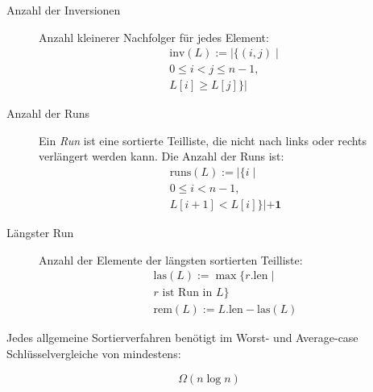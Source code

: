 \documentclass[uniLeipzig]{merkzettel}
\begin{document}
\begin{mzImportant}
  \begin{description}
    \item [Anzahl der Inversionen]
          Anzahl kleinerer Nachfolger für jedes Element:
          \begin{gather*}
            \text{inv} (L) := |\{ (i,j) \mid \\
            0 \leq i < j \leq n - 1, \\
            L[i] \geq L[j] \}|
          \end{gather*}

    \item [Anzahl der Runs]
          Ein \emph{Run} ist eine sortierte Teilliste, die nicht nach links oder rechts verlängert werden kann.
          Die Anzahl der Runs ist:
          \begin{gather*}
            \text{runs} (L) := |\{ i \mid \\
            0 \leq i < n - 1, \\
            L[i + 1] < L[i]  \}| \mathbf{+ 1}
          \end{gather*}

    \item [Längster Run]
          Anzahl der Elemente der längsten sortierten Teilliste:
          \begin{gather*}
            \text{las} (L) := \max \{ r.\text{len} \mid \\
            r \text{ ist Run in } L \} \\
            \text{rem} (L) := L.\text{len} - \text{las} (L)
          \end{gather*}
  \end{description}
\end{mzImportant}

\begin{mzImportant}
  Jedes allgemeine Sortierverfahren benötigt im Worst- und Average-case Schlüsselvergleiche von mindestens:

  $$\Omega (n \log n)$$
\end{mzImportant}
\end{document}
